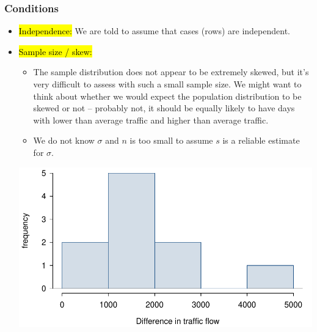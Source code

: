 
\begin{frame}
\frametitle{Conditions}

\begin{itemize}

\item \hl{Independence:} We are told to assume that cases (rows) are independent.

\pause

\item \hl{Sample size / skew:} $\:$ \\

\pause

{
{\tiny
\begin{itemize}

\item The sample distribution does not appear to be extremely skewed, but it's very difficult to assess with such a small sample size. We might want to think about whether we would expect the population distribution to be skewed or not -- probably not, it should be equally likely to have days with lower than average traffic and higher than average traffic.

\item We do not know $\sigma$ and $n$ is too small to assume $s$ is a reliable estimate for $\sigma$.
\end{itemize}
}
}
{
\includegraphics[width=\textwidth]{7-1_one_t/figures/friday/trafficHist}
}

\end{itemize}

$\:$ \\

\pause


\end{frame}

